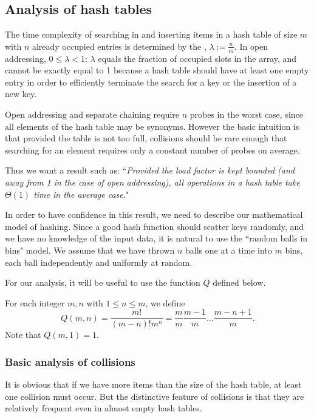\subsection{Analysis of hash tables}

The time complexity of searching in and inserting items in a
hash table of size \(m\) with
\(n\) already occupied entries is determined by the ,
  \(\lambda := \frac{n}{m}\). In open addressing, \(0 \le \lambda < 1\): $\lambda$
  equals the fraction of occupied
slots in the array, and cannot be exactly equal to 1 because a hash table 
should have at least one empty entry in order to efficiently terminate the search 
for a key or the insertion of a new key.

Open addressing and separate chaining require $n$ probes in the worst case, 
since all elements of the hash table may be synonyms. However the basic intuition
is that provided the table is not too full, collisions should be rare enough that
searching for an element requires only a constant number of probes on average.

Thus we want a result such as: ``\emph{Provided the load factor is kept bounded 
(and away from 1 in the case of open addressing), all operations in a hash table 
take $\Theta(1)$ time in the average case.}"

In order to have confidence in this result, we need to describe our mathematical model of 
hashing. Since a good hash function should scatter keys randomly, and we have no
knowledge of the input data, it is natural to use the ``random balls in bins" 
model. We assume that we have thrown $n$ balls one at a time into $m$ bins, 
each ball independently and uniformly at random. 

For our analysis, it will be useful to use the function $Q$ defined below.
 
\begin{Definition}
For each integer $m, n$ with $1 \leq n \leq m$, we define 
$$
Q(m,n) = \frac{m!}{(m-n)! m^n} = \frac{m}{m} \frac{m-1}{m} \dots 
\frac{m - n + 1}{m}.
$$
Note that $Q(m,1) = 1$.
\end{Definition}

\subsubsection{Basic analysis of collisions}

It is obvious that if we have more items than the size of the hash table, at least 
one collision must occur. But the distinctive feature of collisions is that they 
are relatively frequent even in almost empty hash tables. 

